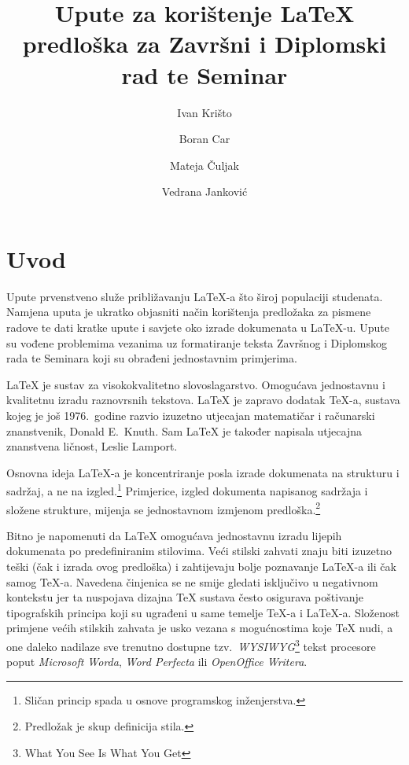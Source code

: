 \documentclass{zavrsni}
\begin{document}
\title{Upute za korištenje \LaTeX{} predloška za Završni i Diplomski rad te Seminar}
\author{Ivan Krišto \and Boran Car \and Mateja Čuljak \and Vedrana Janković}

\maketitle

\tableofcontents

\chapter{Uvod}
Upute prvenstveno služe približavanju \LaTeX-a što široj populaciji studenata.
Namjena uputa je ukratko objasniti način korištenja predložaka za pismene radove
te dati kratke upute i savjete oko izrade dokumenata u \LaTeX-u. Upute su vođene
problemima vezanima uz formatiranje teksta Završnog i Diplomskog rada te Seminara
koji su obrađeni jednostavnim primjerima.

\LaTeX{} je sustav za visokokvalitetno slovoslagarstvo. Omogućava jednostavnu i
kvalitetnu izradu raznovrsnih tekstova. \LaTeX{} je zapravo dodatak \TeX-a, sustava
kojeg je još 1976.\ godine razvio izuzetno utjecajan matematičar i računarski
znanstvenik, Donald E.~Knuth. Sam \LaTeX{} je također napisala utjecajna
znanstvena ličnost, Leslie Lamport.

Osnovna ideja \LaTeX-a je koncentriranje posla izrade dokumenata na strukturu i
sadržaj, a ne na izgled.\footnote{Sličan princip spada u osnove programskog inženjerstva.}
Primjerice, izgled dokumenta napisanog sadržaja i složene strukture, 
mijenja se jednostavnom izmjenom predloška.\footnote{Predložak je skup
definicija stila.}

Bitno je napomenuti da \LaTeX{} omogućava jednostavnu izradu lijepih dokumenata
po predefiniranim stilovima. Veći stilski zahvati znaju biti izuzetno teški (čak i
izrada ovog predloška) i zahtijevaju bolje poznavanje \LaTeX-a ili čak samog
\TeX-a. Navedena činjenica se ne smije gledati isključivo u negativnom kontekstu jer
ta nuspojava dizajna \TeX{} sustava često osigurava poštivanje tipografskih principa
koji su ugrađeni u same temelje \TeX-a i \LaTeX-a. Složenost primjene većih stilskih
zahvata je usko vezana s mogućnostima koje \TeX{} nudi, a one daleko nadilaze sve
trenutno dostupne tzv.\ \emph{WYSIWYG}\footnote{What You See Is What You Get} tekst
procesore poput \emph{Microsoft Worda}, \emph{Word Perfecta} ili \emph{OpenOffice Writera}.
\end{document}

